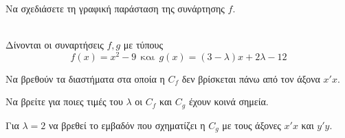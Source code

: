 \documentclass[twoside,nofonts,ektypwsh,math,spyros]{frontisthrio-diag}
\begin{document}
\begin{thema}
\begin{erwthma}
\item Να σχεδιάσετε τη γραφική παράσταση της συνάρτησης $ f $.
\end{erwthma}
\item\mbox{}\\ Δίνονται οι συναρτήσεις $ f,g $ με τύπους
\[ f(x)=x^2-9\ \ \textrm{και}\ \ g(x)=(3-\lambda)x+2\lambda-12 \]
\begin{erwthma}
\item Να βρεθούν τα διαστήματα στα οποία η $ C_f $ δεν βρίσκεται πάνω από τον άξονα $ x'x $.
\item Να βρείτε για ποιες τιμές του $ \lambda $ οι $ C_f $ και $ C_g $ έχουν κοινά σημεία.
\item Για $ \lambda=2 $ να βρεθεί το εμβαδόν που σχηματίζει η $ C_g $ με τους άξονες $ x'x $ και $ y'y $.
\end{erwthma}
\end{thema}
\kaliepityxia
\end{document}
